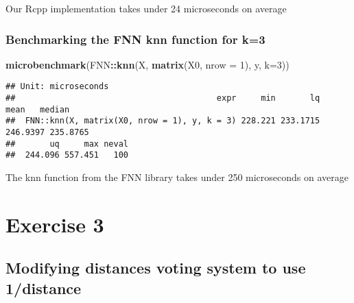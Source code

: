 \documentclass[]{article}
\newenvironment{Shaded}{\begin{snugshade}}{\end{snugshade}}
\newcommand{\DataTypeTok}[1]{\textcolor[rgb]{0.13,0.29,0.53}{#1}}
\newcommand{\DecValTok}[1]{\textcolor[rgb]{0.00,0.00,0.81}{#1}}
\newcommand{\KeywordTok}[1]{\textcolor[rgb]{0.13,0.29,0.53}{\textbf{#1}}}
\newcommand{\NormalTok}[1]{#1}
\newcommand{\OperatorTok}[1]{\textcolor[rgb]{0.81,0.36,0.00}{\textbf{#1}}}
\begin{document}
Our Rcpp implementation takes under 24 microseconds on average

\hypertarget{benchmarking-the-fnn-knn-function-for-k3}{%
\subsubsection{Benchmarking the FNN knn function for
k=3}\label{benchmarking-the-fnn-knn-function-for-k3}}

\begin{Shaded}
\begin{Highlighting}[]
\KeywordTok{microbenchmark}\NormalTok{(FNN}\OperatorTok{::}\KeywordTok{knn}\NormalTok{(X, }\KeywordTok{matrix}\NormalTok{(X0, }\DataTypeTok{nrow =} \DecValTok{1}\NormalTok{), y, }\DataTypeTok{k=}\DecValTok{3}\NormalTok{))}
\end{Highlighting}
\end{Shaded}

\begin{verbatim}
## Unit: microseconds
##                                         expr     min       lq     mean   median
##  FNN::knn(X, matrix(X0, nrow = 1), y, k = 3) 228.221 233.1715 246.9397 235.8765
##       uq     max neval
##  244.096 557.451   100
\end{verbatim}

The knn function from the FNN library takes under 250 microseconds on
average

\newpage

\hypertarget{exercise-3}{%
\section{Exercise 3}\label{exercise-3}}

\hypertarget{modifying-distances-voting-system-to-use-1distance}{%
\subsection{Modifying distances voting system to use
1/distance}\label{modifying-distances-voting-system-to-use-1distance}}
\end{document}

